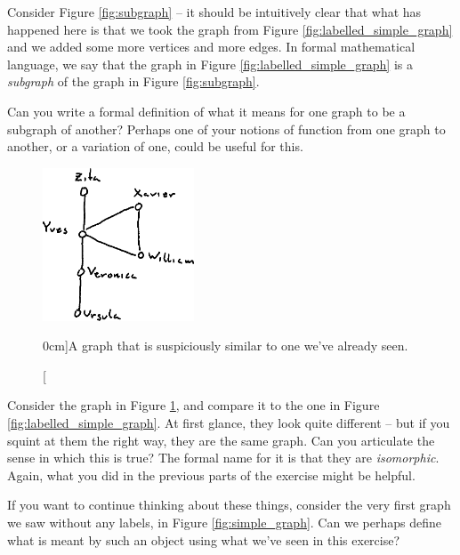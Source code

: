 \documentclass[nobib]{tufte-handout}
\begin{document}
\begin{xca}
  Consider Figure \ref{fig:subgraph} -- it should be intuitively clear that what has happened here is that we took the graph from Figure \ref{fig:labelled_simple_graph} and we added some more vertices and more edges. In formal mathematical language, we say that the graph in Figure \ref{fig:labelled_simple_graph} is a \emph{subgraph} of the graph in Figure \ref{fig:subgraph}.

  Can you write a formal definition of what it means for one graph to be a subgraph of another? Perhaps one of your notions of function from one graph to another, or a variation of one, could be useful for this.
\end{xca}

\begin{figure}
  \centering
  \includegraphics[width=0.4\textwidth]{graphics/L1_exc/isomorph.png}
  \caption[][0cm]{A graph that is suspiciously similar to one we've already seen.}
  \label{fig:isomorph}
\end{figure}

\begin{xca}
    Consider the graph in Figure \ref{fig:isomorph}, and compare it to the one in Figure \ref{fig:labelled_simple_graph}. At first glance, they look quite different -- but if you squint at them the right way, they are the same graph. Can you articulate the sense in which this is true? The formal name for it is that they are \emph{isomorphic}. Again, what you did in the previous parts of the exercise might be helpful.
\end{xca}

If you want to continue thinking about these things, consider the very first graph we saw without any labels, in Figure \ref{fig:simple_graph}. Can we perhaps define what is meant by such an object using what we've seen in this exercise?
\end{document}
